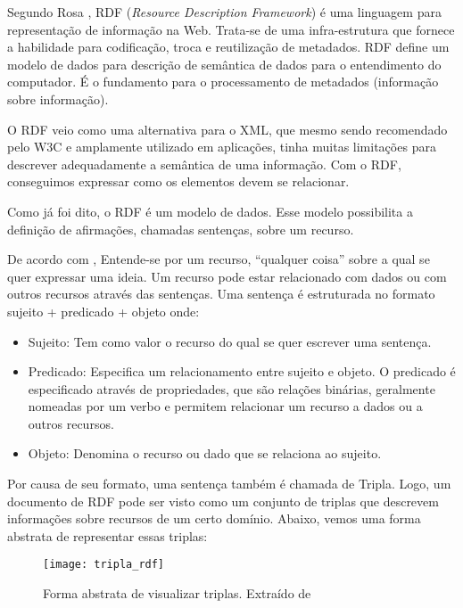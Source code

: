 Segundo Rosa \cite{rosa}, RDF (\emph{Resource Description Framework}) é uma linguagem para representação de informação na Web. Trata-se de uma infra-estrutura que fornece a habilidade para codificação, troca e reutilização de metadados. RDF define um modelo de dados para descrição de semântica de dados para o entendimento do computador. É o fundamento para o processamento de metadados (informação sobre informação). 

O RDF veio como uma alternativa para o XML, que mesmo sendo recomendado pelo W3C e amplamente utilizado em aplicações, tinha muitas limitações para descrever adequadamente a semântica de uma informação. Com o RDF, conseguimos expressar como os elementos devem se relacionar.

Como já foi dito, o RDF é um modelo de dados. Esse modelo possibilita a definição de afirmações, chamadas sentenças, sobre um recurso.

De acordo com \cite{filholoscio}, Entende-se por um recurso, “qualquer coisa” sobre a qual se quer expressar uma ideia. Um recurso pode estar relacionado com dados ou com outros recursos através das sentenças. Uma sentença é estruturada no formato sujeito + predicado + objeto onde: 

\begin{itemize}
\item Sujeito: Tem como valor o recurso do qual se quer escrever uma sentença.
\item Predicado: Especifica um relacionamento entre sujeito e objeto. O predicado é especificado através de propriedades, que são relações binárias, geralmente nomeadas por um verbo e permitem relacionar um recurso a dados ou a outros recursos. 
\item Objeto: Denomina o recurso ou dado que se relaciona ao sujeito.

\end{itemize}

Por causa de seu formato, uma sentença também é chamada de Tripla. Logo, um documento de RDF pode ser visto como um conjunto de triplas que descrevem informações sobre recursos de um certo domínio. Abaixo, vemos uma forma abstrata de representar essas triplas:

\graphicspath{{figuras/}}
\begin{figure}[H]
	\centering
	\texttt{[image: tripla\_rdf]}
	\caption[Forma abstrata de visualizar triplas.]{Forma abstrata de visualizar triplas. Extraído de \cite{filholoscio}}
	\label{tripla_rdf}
\end{figure}

